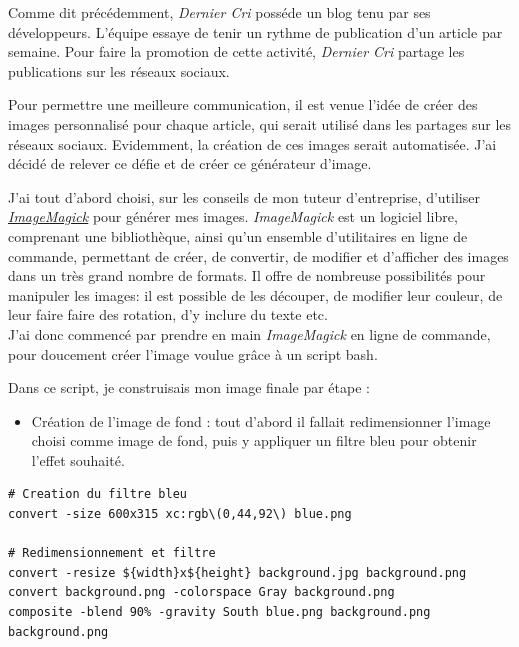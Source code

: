 \bigskip

Comme dit précédemment, \emph{Dernier Cri} posséde un blog tenu par ses
développeurs. L'équipe essaye de tenir un rythme de publication d'un
article par semaine. Pour faire la promotion de cette activité,
\emph{Dernier Cri} partage les publications sur les réseaux sociaux.

\bigskip

Pour permettre une meilleure communication, il est venue l'idée de créer
des images personnalisé pour chaque article, qui serait utilisé dans les
partages sur les réseaux sociaux. Evidemment, la création de ces images
serait automatisée. J'ai décidé de relever ce défie et de créer ce
générateur d'image.

\bigskip

J'ai tout d'abord choisi, sur les conseils de mon tuteur d'entreprise,
d'utiliser
\href{https://www.imagemagick.org/script/index.php}{\emph{ImageMagick}}
pour générer mes images. \emph{ImageMagick} est un logiciel libre,
comprenant une bibliothèque, ainsi qu'un ensemble d'utilitaires en ligne
de commande, permettant de créer, de convertir, de modifier et
d'afficher des images dans un très grand nombre de formats. Il offre de
nombreuse possibilités pour manipuler les images: il est possible de les
découper, de modifier leur couleur, de leur faire faire des rotation,
d'y inclure du texte etc.\\
J'ai donc commencé par prendre en main \emph{ImageMagick} en ligne de
commande, pour doucement créer l'image voulue grâce à un script bash.

\bigskip

Dans ce script, je construisais mon image finale par étape :

\begin{itemize}
\tightlist
\item
  Création de l'image de fond : tout d'abord il fallait redimensionner
  l'image choisi comme image de fond, puis y appliquer un filtre bleu
  pour obtenir l'effet souhaité.
\end{itemize}

\begin{verbatim}
# Creation du filtre bleu
convert -size 600x315 xc:rgb\(0,44,92\) blue.png

# Redimensionnement et filtre
convert -resize ${width}x${height} background.jpg background.png
convert background.png -colorspace Gray background.png
composite -blend 90% -gravity South blue.png background.png background.png
\end{verbatim}

